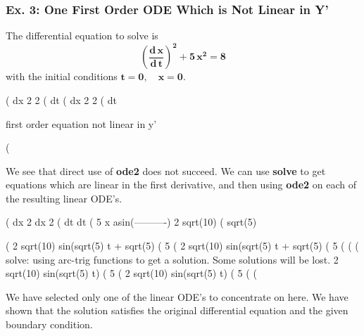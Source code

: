 \documentclass[11pt]{article}
\begin{document}
\subsubsection{Ex. 3: One First Order ODE Which is Not Linear in Y'}
The differential equation to solve is
\begin{equation}
\mathbf{\left( \frac{d\,x}{d\,t} \right)^{2} + 5\,x^{2} = 8 }
\end{equation}
  with the initial conditions $\mathbf{t = 0, \quad x = 0}$.
\begin{myVerbatim}
(%
                                dx 2      2
(%
                                dt
(%
                                dx 2      2
(%
                                dt

                     first order equation not linear in y'

(%
\end{myVerbatim}
We see that direct use of \textbf{ode2} does not succeed. 
We can use \textbf{solve} to get equations which are linear in
  the first derivative, and then using \textbf{ode2} on each of the resulting
  linear ODE's.
\begin{myVerbatim}
(%
                  dx                 2   dx               2
(%
                  dt                     dt
(%
                                  5 x
                          asin(----------)
                               2 sqrt(10)
(%
                              sqrt(5)
\end{myVerbatim}
\newpage
\begin{myVerbatim}
(%
                     2 sqrt(10) sin(sqrt(5) t + sqrt(5) %
(%
                                       5
(%
                     2 sqrt(10) sin(sqrt(5) t + sqrt(5) %
(%
                                       5
(%
(%
(%
solve: using arc-trig functions to get a solution.
Some solutions will be lost.
                            2 sqrt(10) sin(sqrt(5) t)
(%
                                        5
(%
                          2 sqrt(10) sin(sqrt(5) t)
(%
                                      5
(%
(%
\end{myVerbatim}
We have selected only one of the linear ODE's to concentrate on here.
We have shown that the solution satisfies the original differential
  equation and the given boundary condition.
\end{document}
